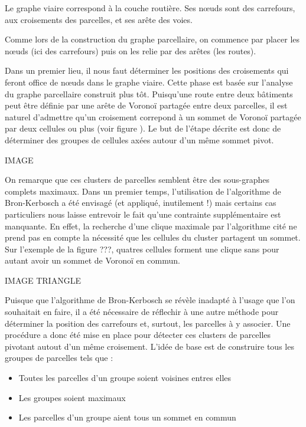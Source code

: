 \documentclass[10pt]{article}
\begin{document}
Le graphe viaire correspond à la couche routière. Ses n\oe uds sont
des carrefours, aux croisements des parcelles, et ses arête des voies.

Comme lors de la construction du graphe parcellaire, on commence par
placer les n\oe uds (ici des carrefours) puis on les relie par des
arêtes (les routes).

Dans un premier lieu, il nous faut déterminer les positions des
croisements qui feront office de n\oe uds dans le graphe viaire. Cette
phase est basée sur l'analyse du graphe parcellaire construit plus
tôt. Puisqu'une route entre deux bâtiments peut être définie par une
arête de Voronoï partagée entre deux parcelles, il est naturel
d'admettre qu'un croisement correpond à un sommet de Voronoï partagée
par deux cellules ou plus (voir figure ). Le but de l'étape décrite
est donc de déterminer des groupes de cellules axées autour d'un même
sommet pivot.

IMAGE

On remarque que ces clusters de parcelles semblent être des
sous-graphes complets maximaux. Dans un premier temps, l'utilisation
de l'algorithme de Bron-Kerbosch a été envisagé (et appliqué,
inutilement !) mais certains cas particuliers nous laisse entrevoir
le fait qu'une contrainte supplémentaire est manquante. En effet, la
recherche d'une clique maximale par l'algorithme cité ne prend pas en
compte la nécessité que les cellules du cluster partagent un
sommet. Sur l'exemple de la figure ???, quatres cellules forment une
clique sans pour autant avoir un sommet de Voronoï en commun.

IMAGE TRIANGLE

Puisque que l'algorithme de Bron-Kerbosch se révèle inadapté à l'usage
que l'on souhaitait en faire, il a été nécessaire de réflechir à une
autre méthode pour déterminer la position des carrefours et, surtout,
les parcelles à y associer. Une procédure a donc été mise en place
pour détecter ces clusters de parcelles pivotant autout d'un même
croisement. L'idée de base est de construire tous les groupes de
parcelles tels que :

\begin{itemize}
\item{Toutes les parcelles d'un groupe soient voisines entres elles}
\item{Les groupes soient maximaux}
\item{Les parcelles d'un groupe aient tous un sommet en commun}
\end{itemize}
\end{document}
